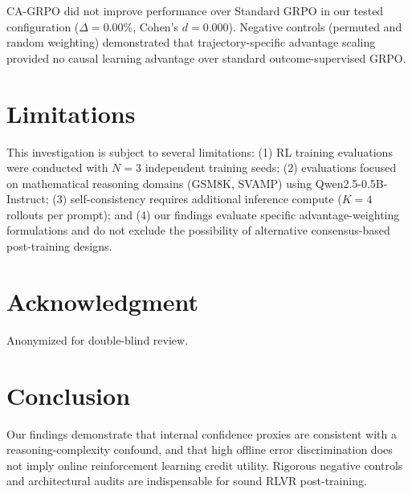 \documentclass[journal]{IEEEtai}
\begin{document}
CA-GRPO did not improve performance over Standard GRPO in our tested configuration ($\Delta = 0.00\%$, Cohen's $d = 0.000$). Negative controls (permuted and random weighting) demonstrated that trajectory-specific advantage scaling provided no causal learning advantage over standard outcome-supervised GRPO.

\section{Limitations}
This investigation is subject to several limitations: (1) RL training evaluations were conducted with $N=3$ independent training seeds; (2) evaluations focused on mathematical reasoning domains (GSM8K, SVAMP) using Qwen2.5-0.5B-Instruct; (3) self-consistency requires additional inference compute ($K=4$ rollouts per prompt); and (4) our findings evaluate specific advantage-weighting formulations and do not exclude the possibility of alternative consensus-based post-training designs.

\section*{Acknowledgment}
Anonymized for double-blind review.

\section{Conclusion}
Our findings demonstrate that internal confidence proxies are consistent with a reasoning-complexity confound, and that high offline error discrimination does not imply online reinforcement learning credit utility. Rigorous negative controls and architectural audits are indispensable for sound RLVR post-training.



\end{document}
